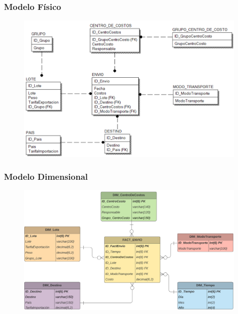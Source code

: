 \documentclass[12pt,letterpaper]{article}
\begin{document}
\subsubsection{\textbf{Modelo Físico }}

	\begin{figure}[htb]
		\begin{center}
			\includegraphics[width=12cm]{./Imagenes/mod_fisico_1}
			
		\end{center}
	\end{figure}

\newpage

\subsubsection{\textbf{Modelo Dimensional }}

	\begin{figure}[htb]
		\begin{center}
			\includegraphics[width=12.5cm]{./Imagenes/mod_dimensional_1}
			
		\end{center}
	\end{figure}
\end{document}
